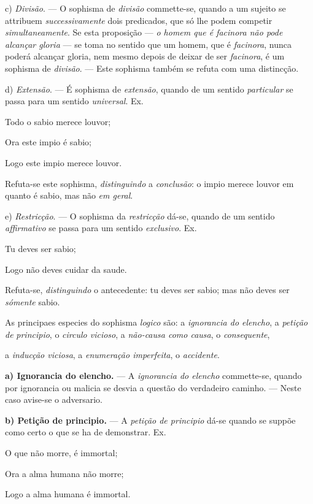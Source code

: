 c) \emph{Divisão}. --- O sophisma de \emph{divisão} commette-se, quando a um sujeito se attribuem \emph{successivamente} dois predicados, que só lhe podem competir \emph{simultaneamente}. Se esta proposição --- \emph{o homem que é facinora não pode alcançar gloria} --- se toma no sentido que um homem, que é \emph{facinora}, nunca poderá   alcançar gloria, nem mesmo depois de deixar de ser \emph{facinora}, é um sophisma de \emph{divisão}. --- Este sophisma também se refuta com uma distincção.

d) \emph{Extensão}. --- É sophisma de \emph{extensão}, quando de um sentido \emph{particular} se passa para um sentido \emph{universal}. Ex.

Todo o sabio merece louvor;

Ora este impio é sabio;

Logo este impio merece louvor.

Refuta-se este sophisma, \emph{distinguindo} a \emph{conclusão}: o impio merece louvor em quanto é sabio, mas não \emph{em geral}.

e) \emph{Restricção}. --- O sophisma da \emph{restricção} dá-se, quando de um sentido \emph{affirmativo} se passa para um sentido \emph{exclusivo}. Ex.

Tu deves ser sabio;

Logo não deves cuidar da saude.

Refuta-se, \emph{distinguindo} o antecedente: tu deves ser sabio; mas não deves ser \emph{sómente} sabio.


As principaes especies do sophisma \emph{logico} são: a \emph{ignorancia do elencho}, a \emph{petição de}   \emph{principio}, o \emph{circulo vicioso}, a \emph{não-causa como causa}, o \emph{consequente},

a \emph{inducção viciosa}, a \emph{enumeração imperfeita}, o \emph{accidente}.

\textbf{a) Ignorancia do elencho.} --- A \emph{ignorancia do elencho} commette-se, quando por ignorancia ou malicia se desvia a questão do verdadeiro caminho. --- Neste caso avise-se o adversario.

\textbf{b) Petição de principio.} --- A \emph{petição de principio} dá-se quando se suppõe como certo o que se ha de demonstrar. Ex.

O que não morre, é immortal;

Ora a alma humana não morre;

Logo a alma humana é immortal.

